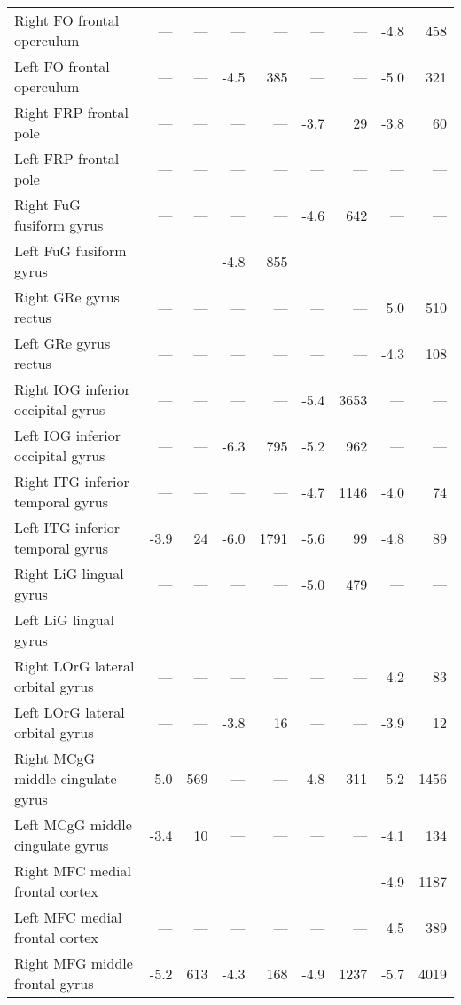 \documentclass[]{article}
\begin{document}
\begin{table}[ht]
{\begin{tabular}{lrrrrrrrr}
  Right FO    frontal operculum & --- & --- & --- & --- & --- & --- & -4.8 & 458 \\ 
  Left FO    frontal operculum & --- & --- & -4.5 & 385 & --- & --- & -5.0 & 321 \\ 
  Right FRP   frontal pole & --- & --- & --- & --- & -3.7 & 29 & -3.8 & 60 \\ 
  Left FRP   frontal pole & --- & --- & --- & --- & --- & --- & --- & --- \\ 
  Right FuG   fusiform gyrus & --- & --- & --- & --- & -4.6 & 642 & --- & --- \\ 
  Left FuG   fusiform gyrus & --- & --- & -4.8 & 855 & --- & --- & --- & --- \\ 
  Right GRe   gyrus rectus & --- & --- & --- & --- & --- & --- & -5.0 & 510 \\ 
  Left GRe   gyrus rectus & --- & --- & --- & --- & --- & --- & -4.3 & 108 \\ 
  Right IOG   inferior occipital gyrus & --- & --- & --- & --- & -5.4 & 3653 & --- & --- \\ 
  Left IOG   inferior occipital gyrus & --- & --- & -6.3 & 795 & -5.2 & 962 & --- & --- \\ 
  Right ITG   inferior temporal gyrus & --- & --- & --- & --- & -4.7 & 1146 & -4.0 & 74 \\ 
  Left ITG   inferior temporal gyrus & -3.9 & 24 & -6.0 & 1791 & -5.6 & 99 & -4.8 & 89 \\ 
  Right LiG   lingual gyrus & --- & --- & --- & --- & -5.0 & 479 & --- & --- \\ 
  Left LiG   lingual gyrus & --- & --- & --- & --- & --- & --- & --- & --- \\ 
  Right LOrG  lateral orbital gyrus & --- & --- & --- & --- & --- & --- & -4.2 & 83 \\ 
  Left LOrG  lateral orbital gyrus & --- & --- & -3.8 & 16 & --- & --- & -3.9 & 12 \\ 
  Right MCgG  middle cingulate gyrus & -5.0 & 569 & --- & --- & -4.8 & 311 & -5.2 & 1456 \\ 
  Left MCgG  middle cingulate gyrus & -3.4 & 10 & --- & --- & --- & --- & -4.1 & 134 \\ 
  Right MFC   medial frontal cortex & --- & --- & --- & --- & --- & --- & -4.9 & 1187 \\ 
  Left MFC   medial frontal cortex & --- & --- & --- & --- & --- & --- & -4.5 & 389 \\ 
  Right MFG   middle frontal gyrus & -5.2 & 613 & -4.3 & 168 & -4.9 & 1237 & -5.7 & 4019 \\ 

\end{tabular}}
\end{table}
\end{document}
